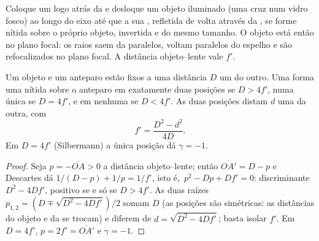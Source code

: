 \begin{method}[Autocolimação]\label{met:b1:mirrors-thin-lenses:autocollimation}
Coloque um  logo atrás da  e desloque um objeto iluminado (uma
cruz num vidro fosco) ao longo do eixo até que a sua , refletida de volta
através da , se forme nítida sobre o próprio objeto, invertida e do
mesmo tamanho. O objeto está então no plano focal: os raios saem da
 paralelos, voltam paralelos do espelho e são refocalizados no
plano focal. A distância objeto--lente vale $f'$.
\end{method}

\begin{proposition}\label{prop:b1:mirrors-thin-lenses:bessel}
Um objeto e um anteparo estão fixos a uma distância $D$ um do outro. Uma  forma uma  nítida sobre o anteparo em exatamente duas posições
se $D > 4f'$, numa única se $D = 4f'$, e em nenhuma se $D < 4f'$. As duas
posições distam $d$ uma da outra, com
\[
f' = \frac{D^2 - d^2}{4D} .
\]
Em $D = 4f'$ (Silbermann) a única posição dá $\gamma = -1$.
\end{proposition}

\begin{proof}
Seja $p = -\overline{OA} > 0$ a distância objeto--lente; então
$\overline{OA'} = D - p$ e Descartes dá $1/(D - p) + 1/p = 1/f'$,
isto é,\ $p^2 - Dp + Df' = 0$: discriminante $D^2 - 4Df'$, positivo se e só se
$D > 4f'$. As duas raízes $p_{1,2} = (D \mp \sqrt{D^2 - 4Df'})/2$ somam
$D$ (as posições são simétricas: as distâncias do objeto e da  se
trocam) e diferem de $d = \sqrt{D^2 - 4Df'}$; basta isolar $f'$. Em
$D = 4f'$, $p = 2f' = \overline{OA'}$ e $\gamma = -1$.
\end{proof}

